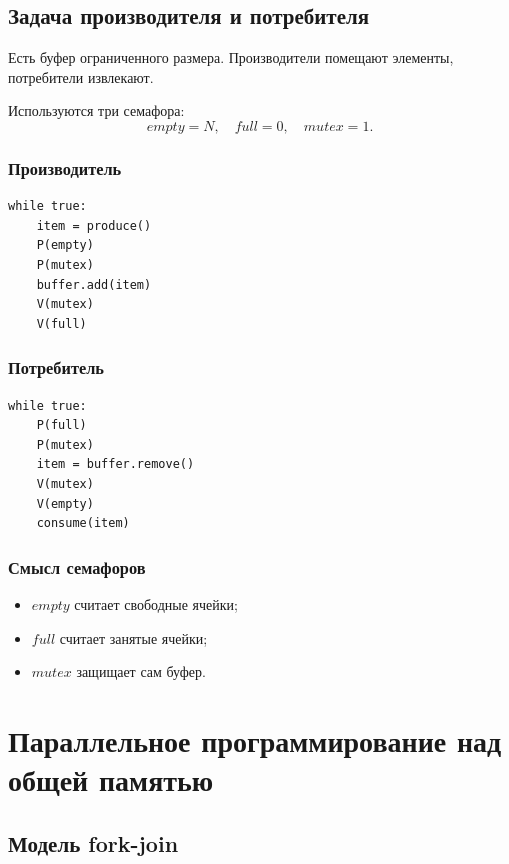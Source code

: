 \documentclass[12pt,a4paper]{article}
\begin{document}
\subsection{Задача производителя и потребителя}

Есть буфер ограниченного размера. Производители помещают элементы, потребители извлекают.

Используются три семафора:
\[
empty = N,\quad full = 0,\quad mutex = 1.
\]

\subsubsection{Производитель}

\begin{lstlisting}
while true:
    item = produce()
    P(empty)
    P(mutex)
    buffer.add(item)
    V(mutex)
    V(full)
\end{lstlisting}

\subsubsection{Потребитель}

\begin{lstlisting}
while true:
    P(full)
    P(mutex)
    item = buffer.remove()
    V(mutex)
    V(empty)
    consume(item)
\end{lstlisting}

\subsubsection{Смысл семафоров}

\begin{itemize}
    \item $empty$ считает свободные ячейки;
    \item $full$ считает занятые ячейки;
    \item $mutex$ защищает сам буфер.
\end{itemize}

\section{Параллельное программирование над общей памятью}

\subsection{Модель fork-join}
\end{document}
